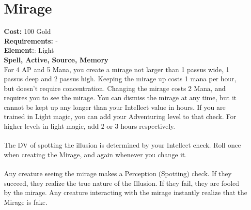 \section*{Mirage}
\textbf{Cost:} 100 Gold\\
\textbf{Requirements:} -\\
\textbf{Element:}: Light\\
\textbf{Spell, Active, Source, Memory}\\
For 4 AP and 5 Mana, you create a mirage not larger than 1 passus wide, 1 passus deep and 2 passus high. Keeping the mirage up costs 1 mana per hour, but doesn't require concentration. Changing the mirage costs 2 Mana, and requires you to see the mirage. You can dismiss the mirage at any time, but it cannot be kept up any longer than your Intellect value in hours. If you are trained in Light magic, you can add your Adventuring level to that check. For higher levels in light magic, add 2 or 3 hours respectively.\\
\\
The DV of spotting the illusion is determined by your Intellect check. Roll once when creating the Mirage, and again whenever you change it. \\
\\
Any creature seeing the mirage makes a Perception (Spotting) check. If they succeed, they realize the true nature of the Illusion. If they fail, they are fooled by the mirage. Any creature interacting with the mirage instantly realize that the Mirage is fake.\\